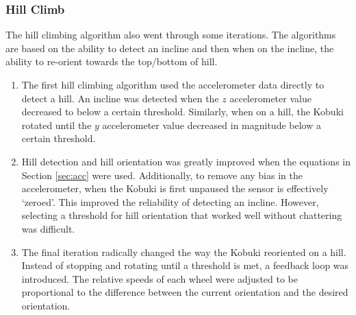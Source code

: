 \documentclass[11pt]{article}
\begin{document}
\subsubsection{Hill Climb}
The hill climbing algorithm also went through some iterations. The algorithms are based on the ability to detect an incline and then when on the incline, the ability to re-orient towards the top/bottom of hill. 
\begin{enumerate}
    \item The first hill climbing algorithm used the accelerometer data directly to detect a hill. An incline was detected when the $z$ accelerometer value decreased to below a certain threshold. Similarly, when on a hill, the Kobuki rotated until the $y$ accelerometer value decreased in magnitude below a certain threshold.
    \item Hill detection and hill orientation was greatly improved when the equations in Section \ref{sec:acc} were used. Additionally, to remove any bias in the accelerometer, when the Kobuki is first unpaused the sensor is effectively `zeroed'. This improved the reliability of detecting an incline. However, selecting a threshold for hill orientation that worked well without chattering was difficult.
    \item The final iteration radically changed the way the Kobuki reoriented on a hill. Instead of stopping and rotating until a threshold is met, a feedback loop was introduced. The relative speeds of each wheel were adjusted to be proportional to the difference between the current orientation and the desired orientation.
\end{enumerate}
\end{document}
